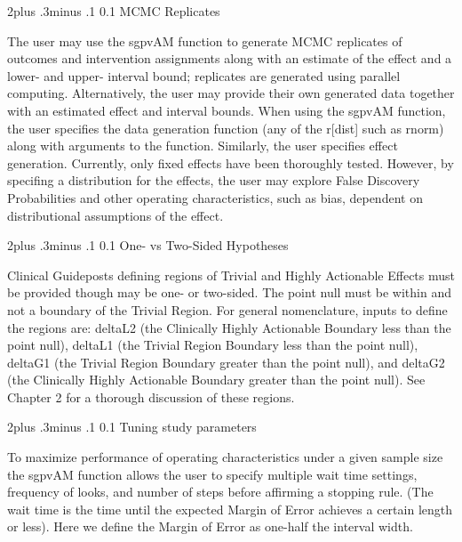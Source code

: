 \documentclass[12pt,oneside]{book}
\makeatletter
\newlength{\li}\setlength{\li}{14.48pt}
\newlength{\di}\setlength{\di}{-3.5mm}
\renewcommand\subsection{\@startsection {subsection}{2}{\z@}%
    {2\@bls  plus .3\@bls minus .1\@bls}%
    {0.1\@bls}%
    {\noindent\normalfont}}
\theoremstyle{definition}
\theoremstyle{definition}
\theoremstyle{definition}
\theoremstyle{remark}
\makeatother
\begin{document}
\hypertarget{mcmc-replicates}{%
\subsection{MCMC Replicates}\label{mcmc-replicates}}

The user may use the sgpvAM function to generate MCMC replicates of
outcomes and intervention assignments along with an estimate of the
effect and a lower- and upper- interval bound; replicates are generated
using parallel computing. Alternatively, the user may provide their own
generated data together with an estimated effect and interval bounds.
When using the sgpvAM function, the user specifies the data generation
function (any of the r{[}dist{]} such as rnorm) along with arguments to
the function. Similarly, the user specifies effect generation.
Currently, only fixed effects have been thoroughly tested. However, by
specifing a distribution for the effects, the user may explore False
Discovery Probabilities and other operating characteristics, such as
bias, dependent on distributional assumptions of the effect.

\hypertarget{one--vs-two-sided-hypotheses}{%
\subsection{One- vs Two-Sided
Hypotheses}\label{one--vs-two-sided-hypotheses}}

Clinical Guideposts defining regions of Trivial and Highly Actionable
Effects must be provided though may be one- or two-sided. The point null
must be within and not a boundary of the Trivial Region. For general
nomenclature, inputs to define the regions are: deltaL2 (the Clinically
Highly Actionable Boundary less than the point null), deltaL1 (the
Trivial Region Boundary less than the point null), deltaG1 (the Trivial
Region Boundary greater than the point null), and deltaG2 (the
Clinically Highly Actionable Boundary greater than the point null). See
Chapter 2 for a thorough discussion of these regions.

\hypertarget{tuning-study-parameters}{%
\subsection{Tuning study parameters}\label{tuning-study-parameters}}

To maximize performance of operating characteristics under a given
sample size the sgpvAM function allows the user to specify multiple wait
time settings, frequency of looks, and number of steps before affirming
a stopping rule. (The wait time is the time until the expected Margin of
Error achieves a certain length or less). Here we define the Margin of
Error as one-half the interval width.
\end{document}
